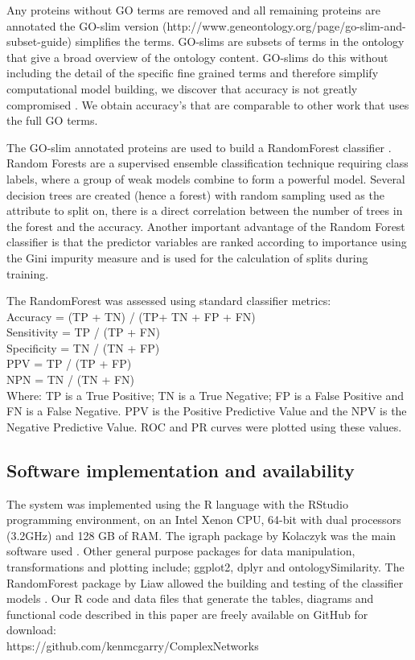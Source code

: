 \documentclass[a4paper,8pt,twocolumn,5p]{elsarticle}
\begin{document}
Any proteins without GO terms are removed and  all remaining proteins are annotated the GO-slim version  (http://www.geneontology.org/page/go-slim-and-subset-guide) simplifies the terms. GO-slims are subsets of terms in the ontology that give a broad overview of the ontology content.  GO-slims do this without including the detail of the specific fine grained terms and therefore simplify computational model building, we discover that accuracy is not greatly compromised \cite{Davis2010}. We obtain accuracy's that are comparable to other work that uses the full GO terms.

The GO-slim annotated proteins are used to build a RandomForest classifier \cite{Breiman2001}.  Random Forests are a supervised ensemble classification technique requiring class labels, where a group of weak models combine to form a powerful model. Several decision trees are created (hence a forest) with random sampling used as the attribute to split on, there is a direct correlation between the number of trees in the forest and the accuracy. Another important advantage of the Random Forest classifier is that the predictor variables are ranked according to importance using the Gini impurity measure and is used for the calculation of splits during training. 

The RandomForest was assessed using standard classifier metrics:\\

\noindent Accuracy = (TP + TN) / (TP+ TN + FP + FN)\\
Sensitivity = TP / (TP + FN) \\
Specificity = TN / (TN + FP) \\
PPV = TP / (TP + FP) \\
NPN = TN / (TN + FN) \\

\noindent Where: TP is a True Positive; TN is a True Negative; FP is a False Positive and FN is a False Negative. PPV is the Positive Predictive Value and the NPV is the Negative Predictive Value. ROC and PR curves were plotted using these values.

\subsection{Software implementation and availability}
The system was implemented using the R language with the RStudio programming environment, on an Intel Xenon CPU, 64-bit with dual processors (3.2GHz) and 128 GB of RAM. The igraph  package by Kolaczyk was the main software used \cite{Kolaczyk2014}. Other general purpose packages for data manipulation, transformations and plotting include; ggplot2, dplyr and ontologySimilarity.  The RandomForest package by Liaw allowed the building and testing of the classifier models \cite{Liaw2002}. Our R code and data files that generate the tables, diagrams and functional code described in this paper are freely available on GitHub for download: \\https://github.com/kenmcgarry/ComplexNetworks
\end{document}
